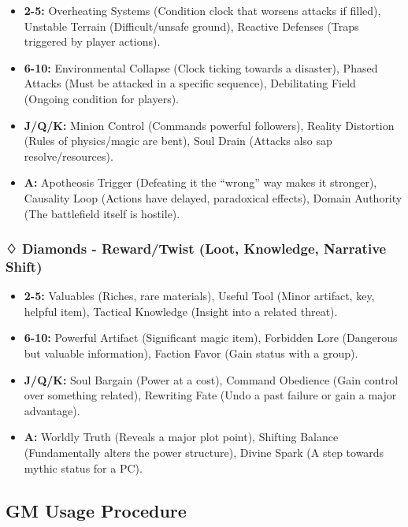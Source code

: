\begin{itemize}
    \item \textbf{2-5:} Overheating Systems (Condition clock that worsens attacks if filled), Unstable Terrain (Difficult/unsafe ground), Reactive Defenses (Traps triggered by player actions).
    \item \textbf{6-10:} Environmental Collapse (Clock ticking towards a disaster), Phased Attacks (Must be attacked in a specific sequence), Debilitating Field (Ongoing condition for players).
    \item \textbf{J/Q/K:} Minion Control (Commands powerful followers), Reality Distortion (Rules of physics/magic are bent), Soul Drain (Attacks also sap resolve/resources).
    \item \textbf{A:} Apotheosis Trigger (Defeating it the ``wrong'' way makes it stronger), Causality Loop (Actions have delayed, paradoxical effects), Domain Authority (The battlefield itself is hostile).
\end{itemize}

\subsubsection{♢ Diamonds - Reward/Twist (Loot, Knowledge, Narrative Shift)}

\begin{itemize}
    \item \textbf{2-5:} Valuables (Riches, rare materials), Useful Tool (Minor artifact, key, helpful item), Tactical Knowledge (Insight into a related threat).
    \item \textbf{6-10:} Powerful Artifact (Significant magic item), Forbidden Lore (Dangerous but valuable information), Faction Favor (Gain status with a group).
    \item \textbf{J/Q/K:} Soul Bargain (Power at a cost), Command Obedience (Gain control over something related), Rewriting Fate (Undo a past failure or gain a major advantage).
    \item \textbf{A:} Worldly Truth (Reveals a major plot point), Shifting Balance (Fundamentally alters the power structure), Divine Spark (A step towards mythic status for a PC).
\end{itemize}

\subsection{GM Usage Procedure}

